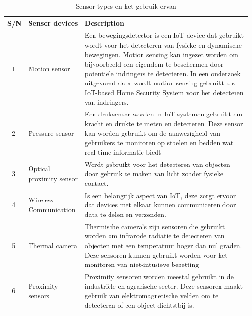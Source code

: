 \begin{table}[h]
    \raggedright
    \renewcommand{\arraystretch}{1.3}
    \small
    \caption{Sensor types en het gebruik ervan \autocite{Moyer2019, Sehrawat2019, Kumar2024, Balogun2017, Meenakshi2020, Tresanchez2018, Shanmugavalli2023, Gala2020, Gade2013, Chidurala2021, Karunarathne2018, Srinivasan2022}}
    \begin{tabular}{|c|m{4cm}|m{10cm}|}
        \hline
        \textbf{S/N} & \textbf{Sensor devices} & \textbf{Description} \\
        \hline
        1. & Motion sensor & Een bewegingsdetector is een IoT-device dat gebruikt wordt voor het detecteren van fysieke en dynamische bewegingen. Motion sensing kan ingezet worden om bijvoorbeeld een eigendom te beschermen door potentiële indringers te detecteren. In een onderzoek uitgevoerd door \autocite{Tiong2019} wordt motion sensing gebruikt als IoT-based Home Security System voor het detecteren van indringers. \\
        \hline
        2. & Pressure sensor & Een druksensor worden in IoT-systemen gebruikt om kracht en drukte te meten en detecteren. Deze sensor kan worden gebruikt om de aanwezigheid van gebruikers te monitoren op stoelen en bedden wat real-time informatie biedt\\
        \hline
        3. & Optical proximity sensor & Wordt gebruikt voor het detecteren van objecten door gebruik te maken van licht zonder fysieke contact. \\
        \hline
        4. & Wireless Communication & Is een belangrijk aspect van IoT, deze zorgt ervoor dat devices met elkaar kunnen communiceren door data te delen en verzenden. \\
        \hline
        5. & Thermal camera & Thermische camera's zijn sensoren die gebruikt worden om infrarode radiatie te detecteren van objecten met een temperatuur hoger dan nul graden. Deze sensoren kunnen gebruikt worden voor het monitoren van niet-intusieve bezetting \\
        \hline
        6. & Proximity sensors & Proximity sensoren worden meestal gebruikt in de industriële en agrarische sector. Deze sensoren maakt gebruik van elektromagnetische velden om te detecteren of een object dichtstbij is. \\

\end{tabular}
\end{table}

